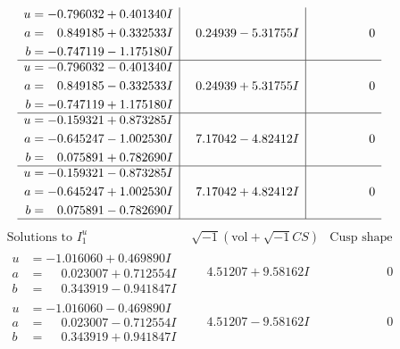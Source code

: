 \documentclass[1p]{elsarticle_modified}
\theoremstyle{definition}
\newcommand{\I}{\sqrt{-1}}
\begin{document}
$$\begin{array}{c|c|c}
\begin{aligned}
u &= -0.796032 + 0.401340 I \\
a &= \phantom{-}0.849185 + 0.332533 I \\
b &= -0.747119 - 1.175180 I\end{aligned}
 & \phantom{-}0.24939 - 5.31755 I & \phantom{-0.000000 } 0 \\ \hline\begin{aligned}
u &= -0.796032 - 0.401340 I \\
a &= \phantom{-}0.849185 - 0.332533 I \\
b &= -0.747119 + 1.175180 I\end{aligned}
 & \phantom{-}0.24939 + 5.31755 I & \phantom{-0.000000 } 0 \\ \hline\begin{aligned}
u &= -0.159321 + 0.873285 I \\
a &= -0.645247 - 1.002530 I \\
b &= \phantom{-}0.075891 + 0.782690 I\end{aligned}
 & \phantom{-}7.17042 - 4.82412 I & \phantom{-0.000000 } 0 \\ \hline\begin{aligned}
u &= -0.159321 - 0.873285 I \\
a &= -0.645247 + 1.002530 I \\
b &= \phantom{-}0.075891 - 0.782690 I\end{aligned}
 & \phantom{-}7.17042 + 4.82412 I & \phantom{-0.000000 } 0\\
 \hline 
 \end{array}$$\newpage$$\begin{array}{c|c|c}  
\text{Solutions to }I^u_{1}& \I (\text{vol} + \sqrt{-1}CS) & \text{Cusp shape}\\
 \hline 
\begin{aligned}
u &= -1.016060 + 0.469890 I \\
a &= \phantom{-}0.023007 + 0.712554 I \\
b &= \phantom{-}0.343919 - 0.941847 I\end{aligned}
 & \phantom{-}4.51207 + 9.58162 I & \phantom{-0.000000 } 0 \\ \hline\begin{aligned}
u &= -1.016060 - 0.469890 I \\
a &= \phantom{-}0.023007 - 0.712554 I \\
b &= \phantom{-}0.343919 + 0.941847 I\end{aligned}
 & \phantom{-}4.51207 - 9.58162 I & \phantom{-0.000000 } 0 \\ \hline\begin{aligned}

\end{aligned}
\end{array}$$
\end{document}
